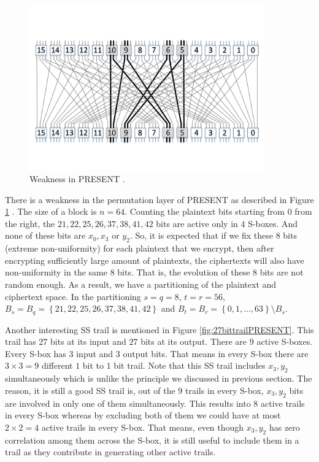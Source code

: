 \begin{figure}[h!]
    \centering
    \includegraphics[width=0.9\textwidth]{images/presentCipherPoorDiffusionweakness}
    \caption{Weakness in PRESENT \cite{SSA_Collard_Standaert}.}
    \label{fig:present_weakness}
\end{figure}
There is a weakness in the permutation layer of PRESENT as described in Figure \ref{fig:present_weakness} \cite{SSA_Collard_Standaert}. The size of a block is $n=64$. Counting the plaintext bits starting from $0$ from the right, the $21,22,25,26,37,38,41,42$ bits are active only in $4$ S-boxes. And none of these bits are $x_0,x_3$ or $y_2$. So, it is expected that if we fix these $8$ bits (extreme non-uniformity) for each plaintext that we encrypt, then after encrypting sufficiently large amount of plaintexts, the ciphertexts will also have non-uniformity in the same $8$ bits. That is, the evolution of these $8$ bits are not random enough. As a result, we have a partitioning of the plaintext and ciphertext space. In the partitioning $s = q = 8$, $t = r = 56$, $B_s = B_q = \left\lbrace 21,22,25,26,37,38,41,42 \right\rbrace$ and $B_t = B_r = \left\lbrace 0,1,...,63  \right\rbrace \setminus B_s$.
\par \noindent Another interesting SS trail is mentioned in Figure \ref{fig:27bittrailPRESENT}. This trail has $27$ bits at its input and $27$ bits at its output. There are $9$ active S-boxes. Every S-box has $3$ input and $3$ output bits. That means in every S-box there are $3 \times 3 = 9$ different $1$ bit to $1$ bit trail. Note that this SS trail includes $x_3,y_2$ simultaneously which is unlike the principle we discussed in previous section. The reason, it is still a good SS trail is, out of the $9$ trails in every S-box, $x_3,y_2$ bits are involved in only one of them simultaneously. This results into $8$ active trails in every S-box whereas by excluding both of them we could have at most $2 \times 2 = 4$ active trails in every S-box. That means, even though $x_3,y_2$ has zero correlation among them across the S-box, it is still useful to include them in a trail as they contribute in generating other active trails.
